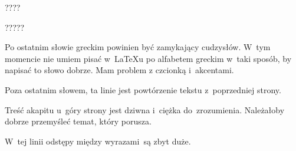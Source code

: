 \documentclass[a4paper,11pt]{article}
\begin{document}
\StrWd{}{} 

\vspace{\spaceFour}





\StrWd{}{} 

\vspace{\spaceFour}




????

\vspace{\spaceFour}





\start {} 

\vspace{\spaceFour}





\start {} 

\vspace{\spaceFour}





\start {} ?????

\vspace{\spaceFour}





\start {} Po ostatnim słowie greckim powinien być
zamykający cudzysłów. W~tym momencie nie umiem pisać w~\LaTeX u po
alfabetem greckim w~taki sposób, by napisać to słowo dobrze. Mam
problem z czcionką i~akcentami.

\vspace{\spaceFour}





\start {} Poza ostatnim słowem, ta linie jest powtórzenie
tekstu z~poprzedniej strony.

\vspace{\spaceFour}





\start {} Treść akapitu u~góry strony jest dziwna i~ciężka
do~zrozumienia. Należałoby dobrze przemyśleć temat, który porusza.

\vspace{\spaceFour}





\start {} W~tej linii odstępy między wyrazami~są zbyt
duże.
\end{document}
